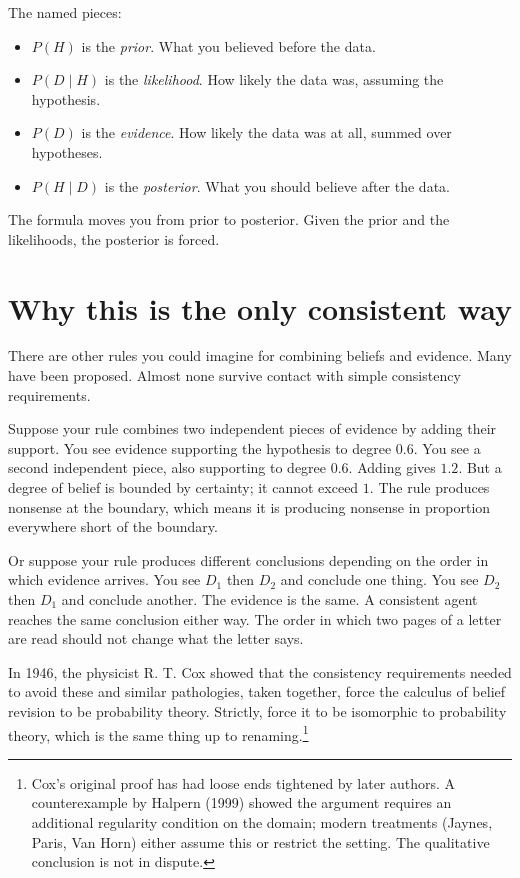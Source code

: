 The named pieces:

\begin{itemize}
\item $P(H)$ is the \emph{prior}. What you believed before the data.
\item $P(D \mid H)$ is the \emph{likelihood}. How likely the data was, assuming the hypothesis.
\item $P(D)$ is the \emph{evidence}. How likely the data was at all, summed over hypotheses.
\item $P(H \mid D)$ is the \emph{posterior}. What you should believe after the data.
\end{itemize}

The formula moves you from prior to posterior. Given the prior and the likelihoods, the posterior is forced.

\section*{Why this is the only consistent way}

There are other rules you could imagine for combining beliefs and evidence. Many have been proposed. Almost none survive contact with simple consistency requirements.

Suppose your rule combines two independent pieces of evidence by adding their support. You see evidence supporting the hypothesis to degree $0.6$. You see a second independent piece, also supporting to degree $0.6$. Adding gives $1.2$. But a degree of belief is bounded by certainty; it cannot exceed $1$. The rule produces nonsense at the boundary, which means it is producing nonsense in proportion everywhere short of the boundary.

Or suppose your rule produces different conclusions depending on the order in which evidence arrives. You see $D_1$ then $D_2$ and conclude one thing. You see $D_2$ then $D_1$ and conclude another. The evidence is the same. A consistent agent reaches the same conclusion either way. The order in which two pages of a letter are read should not change what the letter says.

In 1946, the physicist R. T. Cox showed that the consistency requirements needed to avoid these and similar pathologies, taken together, force the calculus of belief revision to be probability theory. Strictly, force it to be isomorphic to probability theory, which is the same thing up to renaming.\footnote{Cox's original proof has had loose ends tightened by later authors. A counterexample by Halpern (1999) showed the argument requires an additional regularity condition on the domain; modern treatments (Jaynes, Paris, Van Horn) either assume this or restrict the setting. The qualitative conclusion is not in dispute.}

